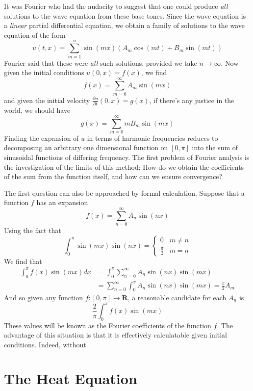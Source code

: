 It was Fourier who had the audacity to suggest that one could produce {\it all} solutions to the wave equation from these base tones. Since the wave equation is a {\it linear} partial differential equation, we obtain a family of solutions to the wave equation of the form
%
\[ u(t,x) = \sum_{m = 1}^n \sin(mx) (A_m \cos(mt) + B_m \sin(mt)) \]
%
Fourier said that these were {\it all} such solutions, provided we take $n \to \infty$. Now given the initial conditions $u(0,x) = f(x)$, we find
%
\[ f(x) = \sum_{m = 0}^\infty A_m \sin(mx) \]
%
and given the initial velocity $\frac{\partial u}{\partial t}(0,x) = g(x)$, if there's any justice in the world, we should have
%
\[ g(x) = \sum_{m = 0}^\infty m B_m \sin(mx) \]
%
Finding the expansion of $u$ in terms of harmonic frequencies reduces to decomposing an arbitrary one dimensional function on $[0,\pi]$ into the sum of sinusoidal functions of differing frequency. The first problem of Fourier analysis is the investigation of the limits of this method; How do we obtain the coefficients of the sum from the function itself, and how can we ensure convergence?

The first question can also be approached by formal calculation. Suppose that a function $f$ has an expansion
%
\[ f(x) = \sum_{n = 0}^\infty A_n \sin(nx) \]
%
Using the fact that
%
\[ \int_0^\pi \sin(mx) \sin(nx) = \begin{cases} 0 & m \neq n \\ \frac{\pi}{2} & m = n \end{cases} \]
%
We find that
%
\begin{align*}
    \int_0^\pi f(x) \sin(mx) dx &= \int_0^\pi \sum_{n = 0}^\infty A_n \sin(nx) \sin(mx)\\
    &= \sum_{n = 0}^\infty \int_0^\pi A_n \sin(nx) \sin(mx) = \frac{\pi}{2} A_m
\end{align*}
%
And so given any function $f:[0,\pi] \to \mathbf{R}$, a reasonable candidate for each $A_n$ is
%
\[ \frac{2}{\pi} \int_0^\pi f(x) \sin(mx) \]
%
These values will be known as the Fourier coefficients of the function $f$. The advantage of this situation is that it is effectively calculatable given initial conditions. Indeed, without 

\section{The Heat Equation}

